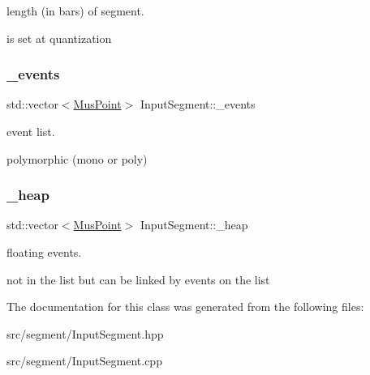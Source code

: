 length (in bars) of segment. 

is set at quantization \mbox{\label{classInputSegment_ac4494ab7de01a9b0f60cdcede78ac847}} 
\subsubsection{\texorpdfstring{\_events}{\_events}}
{\footnotesize\ttfamily std\+::vector$<$\mbox{\hyperlink{classMusPoint}{Mus\+Point}}$>$ Input\+Segment\+::\+\_\+events\hspace{0.3cm}{\ttfamily [protected]}}



event list. 

polymorphic (mono or poly) \mbox{\label{classInputSegment_a8f5be09886f96f15d6c82a2828bef194}} 
\subsubsection{\texorpdfstring{\_heap}{\_heap}}
{\footnotesize\ttfamily std\+::vector$<$\mbox{\hyperlink{classMusPoint}{Mus\+Point}}$>$ Input\+Segment\+::\+\_\+heap\hspace{0.3cm}{\ttfamily [protected]}}



floating events. 

not in the list but can be linked by events on the list 

The documentation for this class was generated from the following files\+:\begin{DoxyCompactItemize}
\item 
src/segment/Input\+Segment.\+hpp\item 
src/segment/Input\+Segment.\+cpp\end{DoxyCompactItemize}
